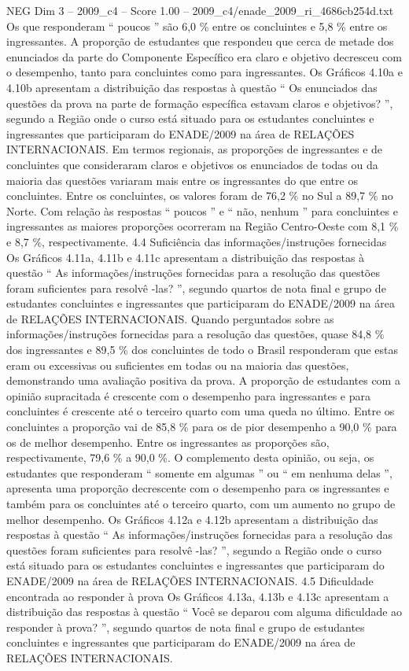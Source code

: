 \begin{textsample}{NEG Dim 3 – 2009\_c4 – Score 1.00 – 2009\_c4/enade\_2009\_ri\_4686cb254d.txt}
Os que responderam “ poucos ” são 6,0 \% entre os concluintes e 5,8 \% entre os ingressantes.
A proporção de estudantes que respondeu que cerca de metade dos enunciados da parte do Componente Específico era claro e objetivo decresceu com o desempenho, tanto para concluintes como para ingressantes.
Os Gráficos 4.10a e 4.10b apresentam a distribuição das respostas à questão “ Os enunciados das questões da prova na parte de formação específica estavam claros e objetivos? ”, segundo a Região onde o curso está situado para os estudantes concluintes e ingressantes que participaram do ENADE/2009 na área de RELAÇÕES INTERNACIONAIS.
Em termos regionais, as proporções de ingressantes e de concluintes que consideraram claros e objetivos os enunciados de todas ou da maioria das questões variaram mais entre os ingressantes do que entre os concluintes.
Entre os concluintes, os valores foram de 76,2 \% no Sul a 89,7 \% no Norte.
Com relação às respostas “ poucos ” e “ não, nenhum ” para concluintes e ingressantes as maiores proporções ocorreram na Região Centro-Oeste com 8,1 \% e 8,7 \%, respectivamente. 4.4 Suficiência das informações/instruções fornecidas Os Gráficos 4.11a, 4.11b e 4.11c apresentam a distribuição das respostas à questão “ As informações/instruções fornecidas para a resolução das questões foram suficientes para resolvê -las? ”, segundo quartos de nota final e grupo de estudantes concluintes e ingressantes que participaram do ENADE/2009 na área de RELAÇÕES INTERNACIONAIS.
Quando perguntados sobre as informações/instruções fornecidas para a resolução das questões, quase 84,8 \% dos ingressantes e 89,5 \% dos concluintes de todo o Brasil responderam que estas eram ou excessivas ou suficientes em todas ou na maioria das questões, demonstrando uma avaliação positiva da prova.
A proporção de estudantes com a opinião supracitada é crescente com o desempenho para ingressantes e para concluintes é crescente até o terceiro quarto com uma queda no último.
Entre os concluintes a proporção vai de 85,8 \% para os de pior desempenho a 90,0 \% para os de melhor desempenho.
Entre os ingressantes as proporções são, respectivamente, 79,6 \% a 90,0 \%.
O complemento desta opinião, ou seja, os estudantes que responderam “ somente em algumas ” ou “ em nenhuma delas ”, apresenta uma proporção decrescente com o desempenho para os ingressantes e também para os concluintes até o terceiro quarto, com um aumento no grupo de melhor desempenho.
Os Gráficos 4.12a e 4.12b apresentam a distribuição das respostas à questão “ As informações/instruções fornecidas para a resolução das questões foram suficientes para resolvê -las? ”, segundo a Região onde o curso está situado para os estudantes concluintes e ingressantes que participaram do ENADE/2009 na área de RELAÇÕES INTERNACIONAIS. 4.5 Dificuldade encontrada ao responder à prova Os Gráficos 4.13a, 4.13b e 4.13c apresentam a distribuição das respostas à questão “ Você se deparou com alguma dificuldade ao responder à prova? ”, segundo quartos de nota final e grupo de estudantes concluintes e ingressantes que participaram do ENADE/2009 na área de RELAÇÕES INTERNACIONAIS.

\end{textsample}
